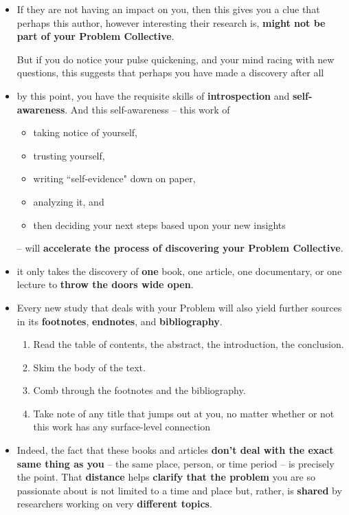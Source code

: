 \documentclass[11pt]{article}
\begin{document}
\begin{itemize}
\begin{exercise}
\begin{itemize}
\item If they are not having an impact on you, then this gives you a clue that perhaps this author, however interesting their research is, \textbf{might not be part of your Problem Collective}. 

But if you do notice your pulse quickening, and your mind racing with new questions, this suggests that perhaps you have made a discovery after all

\item by this point, you have the requisite skills of \textbf{introspection} and \textbf{self-awareness}. And this self-awareness -- this work of 
\begin{itemize}
\item taking notice of yourself, 
\item trusting yourself, 
\item writing ``self-evidence" down on paper, 
\item analyzing it, and 
\item then deciding your next steps based upon your new insights
\end{itemize}
 -- will \textbf{accelerate the process of discovering your Problem Collective}.
 
\item it only takes the discovery of \textbf{one} book, one article, one documentary, or one lecture to \textbf{throw the doors wide open}.

\item Every new study that deals with your Problem will also yield further sources in its \textbf{footnotes}, \textbf{endnotes}, and \textbf{bibliography}. 
\begin{enumerate}
\item Read the table of contents, the abstract, the introduction, the conclusion. 
\item Skim the body of the text. 
\item Comb through the footnotes and the bibliography. 
\item Take note of any title that jumps out at you, no matter whether or not this work has any surface-level connection
\end{enumerate}

\item Indeed, the fact that these books and articles \textbf{don’t deal with the exact same thing as you} -- the same place, person, or time period -- is precisely the point. That \textbf{distance} helps \textbf{clarify that the problem} you are so passionate about is not limited to a time and place but, rather, is \textbf{shared} by researchers working on very \textbf{different topics}.
\end{itemize}
\end{exercise}

\end{itemize}
\end{document}
